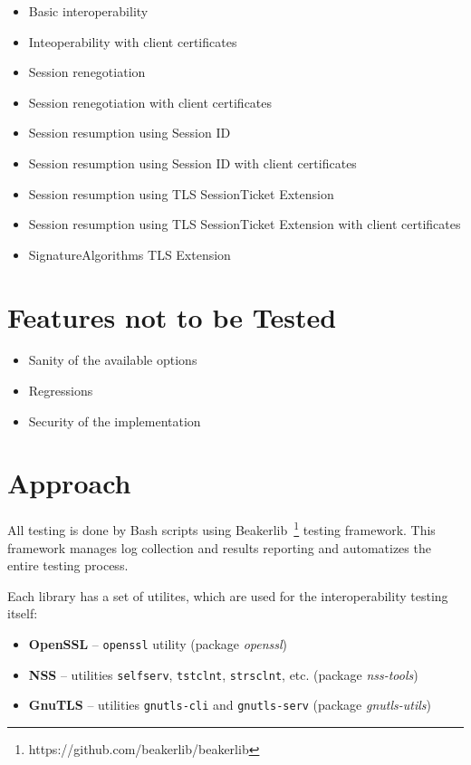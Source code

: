     \begin{itemize}
        \item Basic interoperability
        \item Inteoperability with client certificates
        \item Session renegotiation
        \item Session renegotiation with client certificates
        \item Session resumption using Session ID
        \item Session resumption using Session ID with client certificates
        \item Session resumption using TLS SessionTicket Extension
        \item Session resumption using TLS SessionTicket Extension with client certificates
        \item SignatureAlgorithms TLS Extension
    \end{itemize}

\section{Features not to be Tested}
    \begin{itemize}
        \item Sanity of the available options
        \item Regressions
        \item Security of the implementation
    \end{itemize}

\section{Approach}
    All testing is done by Bash scripts using
    Beakerlib~\footnote{https://github.com/beakerlib/beakerlib} testing framework.
    This framework manages log collection and results reporting and automatizes
    the entire testing process.

    Each library has a set of utilites, which are used for the interoperability
    testing itself:

    \begin{itemize}
        \item \textbf{OpenSSL} -- \texttt{openssl} utility (package \textit{openssl})
        \item \textbf{NSS} -- utilities \texttt{selfserv}, \texttt{tstclnt},
              \texttt{strsclnt}, etc. (package \textit{nss-tools})
        \item \textbf{GnuTLS} -- utilities \texttt{gnutls-cli} and
              \texttt{gnutls-serv} (package \textit{gnutls-utils})
    \end{itemize}

